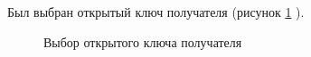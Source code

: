 \documentclass[10pt,a4paper]{report}
\begin{document}
Был выбран открытый ключ получателя (рисунок \ref{ris:image3} ).\\

\begin{figure}[h]
\caption{Выбор открытого ключа получателя}
\label{ris:image3}
\end{figure}
\end{document}
